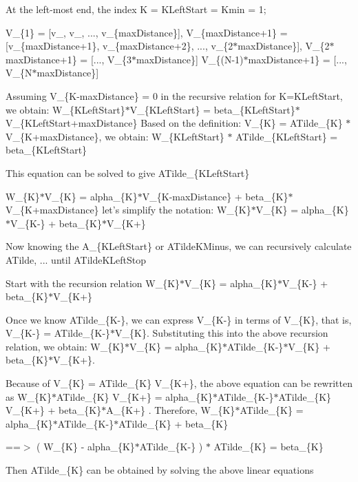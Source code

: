 At the left-most end, the index K = KLeft\-Start = Kmin = 1;

V\_\-\{1\} = [v\_, v\_, ..., v\_\-\{max\-Distance\}], V\_\-\{max\-Distance+1\} = [v\_\-\{max\-Distance+1\}, v\_\-\{max\-Distance+2\}, ..., v\_\-\{2$\ast$max\-Distance\}], V\_\-\{2$\ast$max\-Distance+1\} = [..., V\_\-\{3$\ast$max\-Distance\}] V\_\-\{(N-1)$\ast$max\-Distance+1\} = [..., V\_\-\{N$\ast$max\-Distance\}]

Assuming V\_\-\{K-max\-Distance\} = 0 in the recursive relation for K=KLeft\-Start, we obtain: W\_\-\{KLeft\-Start\}$\ast$V\_\-\{KLeft\-Start\} = beta\_\-\{KLeft\-Start\}$\ast$V\_\-\{KLeft\-Start+max\-Distance\} Based on the definition: V\_\-\{K\} = ATilde\_\-\{K\} $\ast$ V\_\-\{K+max\-Distance\}, we obtain: W\_\-\{KLeft\-Start\} $\ast$ ATilde\_\-\{KLeft\-Start\} = beta\_\-\{KLeft\-Start\}

This equation can be solved to give ATilde\_\-\{KLeft\-Start\}

W\_\-\{K\}$\ast$V\_\-\{K\} = alpha\_\-\{K\}$\ast$V\_\-\{K-max\-Distance\} + beta\_\-\{K\}$\ast$V\_\-\{K+max\-Distance\} let's simplify the notation: W\_\-\{K\}$\ast$V\_\-\{K\} = alpha\_\-\{K\}$\ast$V\_\-\{K-\} + beta\_\-\{K\}$\ast$V\_\-\{K+\}

Now knowing the A\_\-\{KLeft\-Start\} or ATilde\-KMinus, we can recursively calculate ATilde, ... until ATilde\-KLeft\-Stop

Start with the recursion relation W\_\-\{K\}$\ast$V\_\-\{K\} = alpha\_\-\{K\}$\ast$V\_\-\{K-\} + beta\_\-\{K\}$\ast$V\_\-\{K+\}

Once we know ATilde\_\-\{K-\}, we can express V\_\-\{K-\} in terms of V\_\-\{K\}, that is, V\_\-\{K-\} = ATilde\_\-\{K-\}$\ast$V\_\-\{K\}. Substituting this into the above recursion relation, we obtain: W\_\-\{K\}$\ast$V\_\-\{K\} = alpha\_\-\{K\}$\ast$ATilde\_\-\{K-\}$\ast$V\_\-\{K\} + beta\_\-\{K\}$\ast$V\_\-\{K+\}.

Because of V\_\-\{K\} = ATilde\_\-\{K\} V\_\-\{K+\}, the above equation can be rewritten as W\_\-\{K\}$\ast$ATilde\_\-\{K\} V\_\-\{K+\} = alpha\_\-\{K\}$\ast$ATilde\_\-\{K-\}$\ast$ATilde\_\-\{K\} V\_\-\{K+\} + beta\_\-\{K\}$\ast$A\_\-\{K+\} . Therefore, W\_\-\{K\}$\ast$ATilde\_\-\{K\} = alpha\_\-\{K\}$\ast$ATilde\_\-\{K-\}$\ast$ATilde\_\-\{K\} + beta\_\-\{K\}

==$>$ ( W\_\-\{K\} - alpha\_\-\{K\}$\ast$ATilde\_\-\{K-\} ) $\ast$ ATilde\_\-\{K\} = beta\_\-\{K\}

Then ATilde\_\-\{K\} can be obtained by solving the above linear equations 
